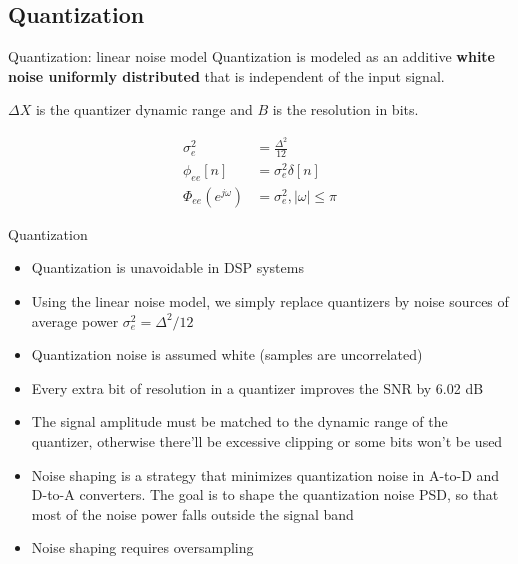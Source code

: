 \documentclass[10pt, aspectratio=169]{beamer}
\begin{document}
\subsection{Quantization}
\begin{frame}{Quantization: linear noise model}
Quantization is modeled as an additive \textbf{white noise uniformly distributed} that is independent of the input signal. 

\begin{center}
	\resizebox{0.5\textwidth}{!}{}
\end{center}
\vspace{-0.3cm}

$\Delta X$ is the quantizer dynamic range and $B$ is the resolution in bits.

\begin{align*}
\sigma_e^2 &= \frac{\Delta^2}{12} \tag{average power} \\
\phi_{ee}[n] &= \sigma_e^2\delta[n] \tag{autocorrelation function} \\
\Phi_{ee}(e^{j\omega}) &= \sigma_e^2, |\omega| \leq \pi \tag{PSD}
\end{align*}
\end{frame}

%
\begin{frame}{Quantization}
\begin{itemize}
	\item Quantization is unavoidable in DSP systems
	\item Using the linear noise model, we simply replace quantizers by noise sources of average power $\sigma_e^2 = \Delta^2/12$
	\item Quantization noise is assumed white (samples are uncorrelated)
	\item Every extra bit of resolution in a quantizer improves the SNR by 6.02 dB
	\item The signal amplitude must be matched to the dynamic range of the quantizer, otherwise there'll be excessive clipping or some bits won't be used
	\item Noise shaping is a strategy that minimizes quantization noise in A-to-D and D-to-A converters. The goal is to shape the quantization noise PSD, so that most of the noise power falls outside the signal band
	\item Noise shaping requires oversampling
\end{itemize}
\end{frame}

%
\end{document}
